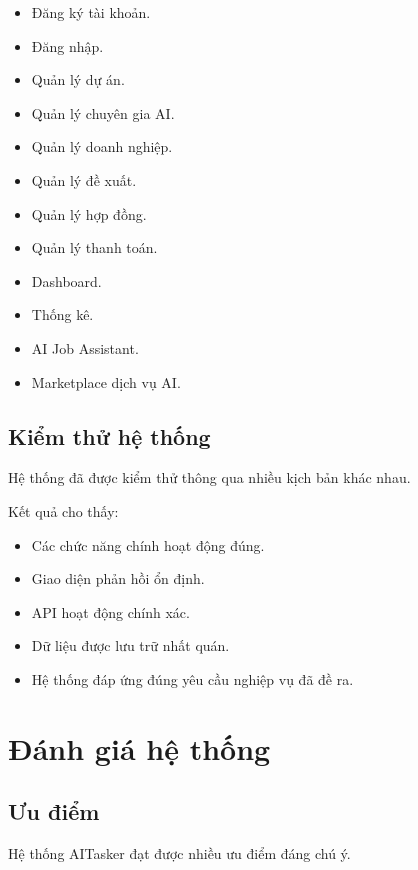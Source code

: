 \begin{itemize}
\item Đăng ký tài khoản.
\item Đăng nhập.
\item Quản lý dự án.
\item Quản lý chuyên gia AI.
\item Quản lý doanh nghiệp.
\item Quản lý đề xuất.
\item Quản lý hợp đồng.
\item Quản lý thanh toán.
\item Dashboard.
\item Thống kê.
\item AI Job Assistant.
\item Marketplace dịch vụ AI.
\end{itemize}


\subsection{Kiểm thử hệ thống}

Hệ thống đã được kiểm thử thông qua nhiều kịch bản khác nhau.

Kết quả cho thấy:

\begin{itemize}
\item Các chức năng chính hoạt động đúng.
\item Giao diện phản hồi ổn định.
\item API hoạt động chính xác.
\item Dữ liệu được lưu trữ nhất quán.
\item Hệ thống đáp ứng đúng yêu cầu nghiệp vụ đã đề ra.
\end{itemize}

\section{Đánh giá hệ thống}

\subsection{Ưu điểm}

Hệ thống AITasker đạt được nhiều ưu điểm đáng chú ý.

